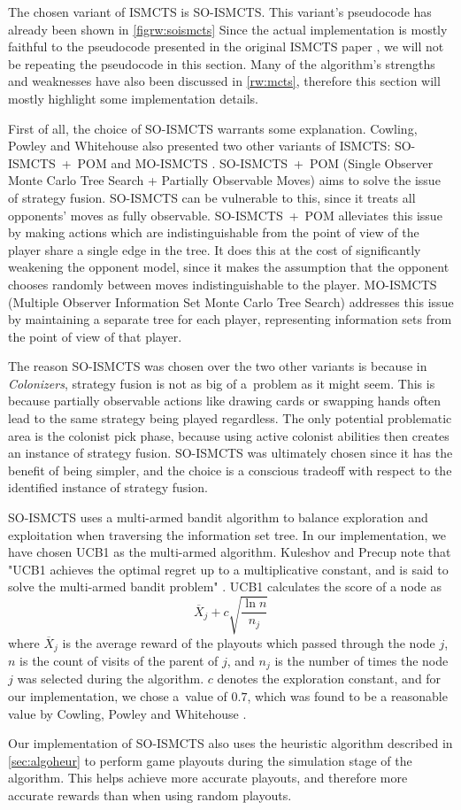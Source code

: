 The chosen variant of ISMCTS is SO-ISMCTS. This variant's pseudocode
has already been shown in \autoref{figrw:soismcts} Since the actual
implementation is mostly faithful to the pseudocode presented in the original
ISMCTS paper \cite{Cowling12}, we will not be repeating the pseudocode in this section.
Many of the algorithm's strengths and weaknesses have also been discussed in
\autoref{rw:mcts}, therefore this section will mostly highlight some implementation
details.

First of all, the choice of SO-ISMCTS warrants some explanation. Cowling, Powley
and Whitehouse also presented two other variants of ISMCTS: SO-ISMCTS~+~POM and
MO-ISMCTS \cite{Cowling12}. SO-ISMCTS~+~POM (Single Observer Monte Carlo
Tree Search + Partially Observable Moves) aims to solve the issue of
strategy fusion. SO-ISMCTS can be vulnerable to this, since it treats all
opponents' moves as fully observable. SO-ISMCTS~+~POM alleviates this issue
by making actions which are indistinguishable from the point of view of the player
share a single edge in the tree. It does this at the cost of significantly weakening
the opponent model, since it makes the assumption that the opponent chooses randomly
between moves indistinguishable to the player. MO-ISMCTS (Multiple Observer Information
Set Monte Carlo Tree Search) addresses this issue by maintaining a separate tree
for each player, representing information sets from the point of view of that player.

The reason SO-ISMCTS was chosen over the two other variants is because in \emph{Colonizers},
strategy fusion is not as big of a~problem as it might seem. This is because
partially observable actions like drawing cards or swapping hands often lead to the
same strategy being played regardless. The only potential problematic area
is the colonist pick phase, because using active colonist abilities then
creates an instance of strategy fusion. SO-ISMCTS was ultimately chosen
since it has the benefit of being simpler, and the choice is a conscious
tradeoff with respect to the identified instance of strategy fusion.

\clearpage
SO-ISMCTS uses a multi-armed bandit algorithm to balance exploration
and exploitation when traversing the information set tree.
In our implementation, we have chosen UCB1 as the multi-armed algorithm.
Kuleshov and Precup note that "UCB1 achieves the optimal regret up to a
multiplicative constant, and is said to solve the multi-armed bandit problem"
\cite{Kuleshov00}. UCB1 calculates the score of a node as
$$\overline{X}_{j} + c\sqrt{\frac{\ln{n}}{n_{j}}}$$
where $\overline{X}_{j}$ is the average reward of the playouts which passed through
the node $j$, $n$ is the count of visits of the parent of $j$, and $n_{j}$
is the number of times the node $j$ was selected during the algorithm.
$c$ denotes the exploration constant, and for our implementation, we chose a~value
of $0.7$, which was found to be a reasonable value by Cowling, Powley and Whitehouse
\cite{Cowling12}.

Our implementation of SO-ISMCTS also uses the heuristic algorithm
described in \autoref{sec:algoheur} to perform
game playouts during the simulation stage of the algorithm. This helps
achieve more accurate playouts, and therefore more accurate rewards
than when using random playouts.
